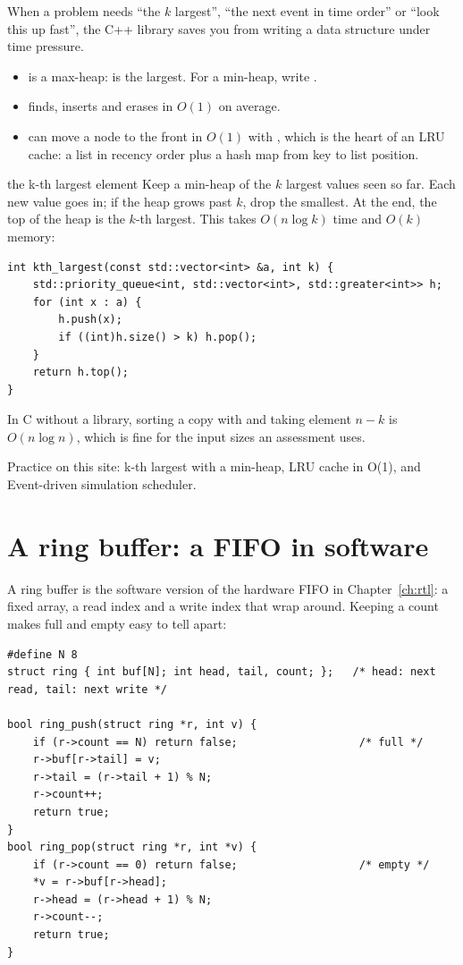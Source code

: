 When a problem needs ``the $k$ largest'', ``the next event in time order'' or ``look this up fast'', the C++ library saves you from writing a data structure under time pressure.

\begin{itemize}
  \item {} is a max-heap:  is the largest. For a min-heap, write .
  \item {} finds, inserts and erases in $O(1)$ on average.
  \item {} can move a node to the front in $O(1)$ with , which is the heart of an LRU cache: a list in recency order plus a hash map from key to list position.
\end{itemize}

\begin{worked}{the k-th largest element}
Keep a min-heap of the $k$ largest values seen so far. Each new value goes in; if the heap grows past $k$, drop the smallest. At the end, the top of the heap is the $k$-th largest. This takes $O(n \log k)$ time and $O(k)$ memory:
\begin{lstlisting}
int kth_largest(const std::vector<int> &a, int k) {
    std::priority_queue<int, std::vector<int>, std::greater<int>> h;
    for (int x : a) {
        h.push(x);
        if ((int)h.size() > k) h.pop();
    }
    return h.top();
}
\end{lstlisting}
In C without a library, sorting a copy with  and taking element $n - k$ is $O(n \log n)$, which is fine for the input sizes an assessment uses.
\end{worked}

Practice on this site: k-th largest with a min-heap, LRU cache in O(1), and Event-driven simulation scheduler.

\section{A ring buffer: a FIFO in software}

A ring buffer is the software version of the hardware FIFO in Chapter~\ref{ch:rtl}: a fixed array, a read index and a write index that wrap around. Keeping a count makes full and empty easy to tell apart:

\begin{lstlisting}
#define N 8
struct ring { int buf[N]; int head, tail, count; };   /* head: next read, tail: next write */

bool ring_push(struct ring *r, int v) {
    if (r->count == N) return false;                   /* full */
    r->buf[r->tail] = v;
    r->tail = (r->tail + 1) % N;
    r->count++;
    return true;
}
bool ring_pop(struct ring *r, int *v) {
    if (r->count == 0) return false;                   /* empty */
    *v = r->buf[r->head];
    r->head = (r->head + 1) % N;
    r->count--;
    return true;
}
\end{lstlisting}

